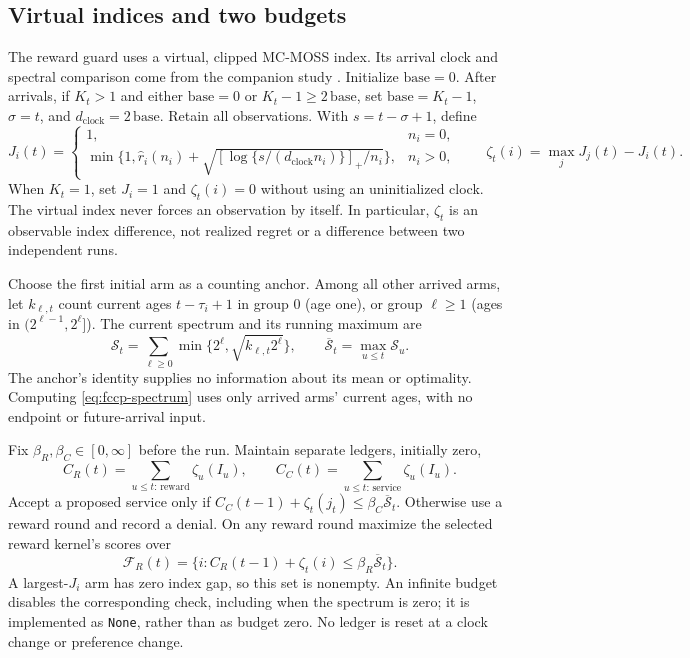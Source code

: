 \documentclass[11pt]{article}
\theoremstyle{remark}
\begin{document}
\subsection{Virtual indices and two budgets}\label{sec:fccp-budgets}
The reward guard uses a virtual, clipped MC-MOSS index. Its arrival clock
and spectral comparison come from the companion study
\citep{temporalgeometry2026}. Initialize $\mathrm{base}=0$. After arrivals,
if $K_t>1$ and either $\mathrm{base}=0$ or $K_t-1\ge2\,\mathrm{base}$,
set $\mathrm{base}=K_t-1$, $\sigma=t$, and
$d_{\mathrm{clock}}=2\,\mathrm{base}$. Retain all observations. With
$s=t-\sigma+1$, define
\begin{equation}\label{eq:fccp-index}
 J_i(t)=\begin{cases}
 1,&n_i=0,\\
 \min\{1,\hat r_i(n_i)+
       \sqrt{[\log\{s/(d_{\mathrm{clock}}n_i)\}]_+/n_i}\},&n_i>0,
 \end{cases}\qquad
 \zeta_t(i)=\max_jJ_j(t)-J_i(t).
\end{equation}
When $K_t=1$, set $J_i=1$ and $\zeta_t(i)=0$ without using an
uninitialized clock. The virtual index never forces an observation by
itself. In particular, $\zeta_t$ is an observable index difference,
not realized regret or a difference between two independent runs.

Choose the first initial arm as a counting anchor. Among all other
arrived arms, let $k_{\ell,t}$ count current ages $t-\tau_i+1$ in group
$0$ (age one), or group $\ell\ge1$ (ages in
$(2^{\ell-1},2^\ell]$). The current spectrum and its running maximum are
\begin{equation}\label{eq:fccp-spectrum}
 \mathcal S_t=\sum_{\ell\ge0}
       \min\{2^\ell,\sqrt{k_{\ell,t}2^\ell}\},\qquad
 \overline{\mathcal S}_t=\max_{u\le t}\mathcal S_u.
\end{equation}
The anchor's identity supplies no information about its mean or
optimality. Computing \eqref{eq:fccp-spectrum} uses only arrived arms'
current ages, with no endpoint or future-arrival input.

Fix $\beta_R,\beta_C\in[0,\infty]$ before the run. Maintain separate
ledgers, initially zero,
\begin{equation}\label{eq:fccp-ledgers}
 C_R(t)=\sum_{u\le t:\,\mathrm{reward}}\zeta_u(I_u),\qquad
 C_C(t)=\sum_{u\le t:\,\mathrm{service}}\zeta_u(I_u).
\end{equation}
Accept a proposed service only if
$C_C(t-1)+\zeta_t(j_t)\le\beta_C\overline{\mathcal S}_t$.
Otherwise use a reward round and record a denial. On any reward round
maximize the selected reward kernel's scores over
\begin{equation}\label{eq:fccp-feasible}
 \mathcal F_R(t)=\{i:C_R(t-1)+\zeta_t(i)
                                  \le\beta_R\overline{\mathcal S}_t\}.
\end{equation}
A largest-$J_i$ arm has zero index gap, so this set is nonempty. An infinite
budget disables the corresponding check, including when the spectrum is
zero; it is implemented as \texttt{None}, rather than as budget zero.
No ledger is reset at a clock change or preference change.
\end{document}
